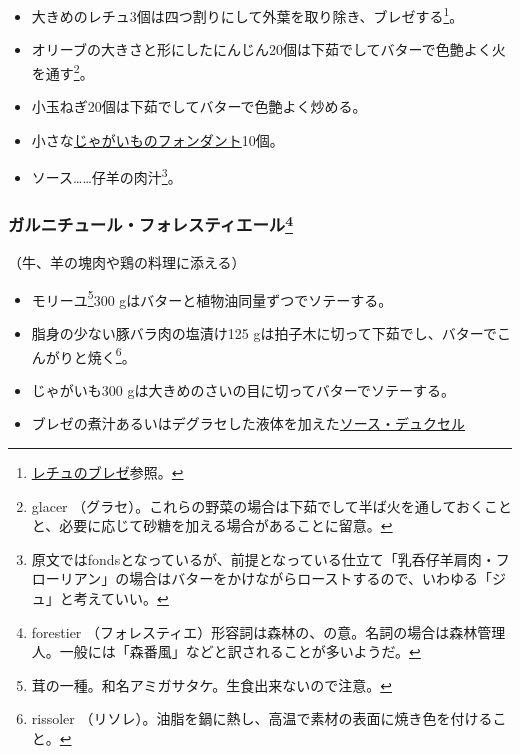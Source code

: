 \begin{recette}
\begin{itemize}
\item
  大きめのレチュ3個は四つ割りにして外葉を取り除き、ブレゼする\footnote{\protect\hyperlink{laitue-braisee}{レチュのブレゼ}参照。}。
\item
  オリーブの大きさと形にしたにんじん20個は下茹でしてバターで色艶よく火を通す\footnote{glacer
    （グラセ）。これらの野菜の場合は下茹でして半ば火を通しておくことと、必要に応じて砂糖を加える場合があることに留意。}。
\item
  小玉ねぎ20個は下茹でしてバターで色艶よく炒める。
\item
  小さな\protect\hyperlink{pommes-de-terre-fondantes}{じゃがいものフォンダント}10個。
\item
  ソース\ldots{}\ldots{}仔羊の肉汁\footnote{原文ではfondsとなっているが、前提となっている仕立て「乳呑仔羊肩肉・フローリアン」の場合はバターをかけながらローストするので、いわゆる「ジュ」と考えていい。}。
\end{itemize}

\hypertarget{garniture-a-la-Forestiere}{%
\subsubsection[ガルニチュール・フォレスティエール]{\texorpdfstring{ガルニチュール・フォレスティエール\footnote{forestier
  （フォレスティエ）形容詞は森林の、の意。名詞の場合は森林管理人。一般には「森番風」などと訳されることが多いようだ。}}{ガルニチュール・フォレスティエール}}\label{garniture-a-la-Forestiere}}



（牛、羊の塊肉や鶏の料理に添える）

\begin{itemize}
\item
  モリーユ\footnote{茸の一種。和名アミガサタケ。生食出来ないので注意。}300
  gはバターと植物油同量ずつでソテーする。
\item
  脂身の少ない豚バラ肉の塩漬け125
  gは拍子木に切って下茹でし、バターでこんがりと焼く\footnote{rissoler
    （リソレ）。油脂を鍋に熱し、高温で素材の表面に焼き色を付けること。}。
\item
  じゃがいも300 gは大きめのさいの目に切ってバターでソテーする。
\item
  ブレゼの煮汁あるいはデグラセした液体を加えた\protect\hyperlink{sauce-duxelles}{ソース・デュクセル}
\end{itemize}


\end{recette}
